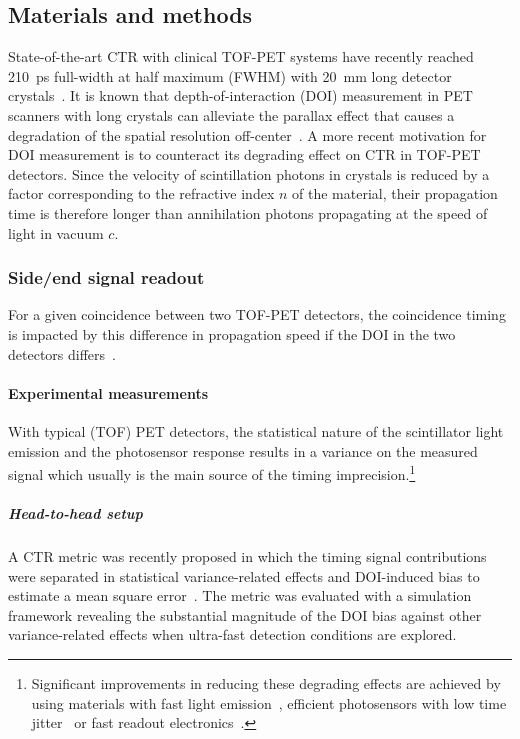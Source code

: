 \documentclass[demo]{OUP-EJ}
\begin{document}
\subsection{Materials and methods}\label{isect2}



State-of-the-art CTR with clinical TOF-PET systems have recently reached 210~ps full-width at half maximum (FWHM) with 20~mm long detector crystals~\citep{vanSluis2019}.
It is known that depth-of-interaction (DOI) measurement in PET scanners with long crystals can alleviate the parallax effect that causes a degradation of the spatial resolution off-center~\citep{Lecomte2009,Cherry2012}.
A more recent motivation for DOI measurement is to counteract its degrading effect on CTR in TOF-PET detectors.
Since the velocity of scintillation photons in crystals is reduced by a factor corresponding to the refractive index $n$ of the material, their propagation time is therefore longer than annihilation photons propagating at the speed of light in vacuum $c$.

\subsubsection{Side/end signal readout}\label{isect3}

For a given coincidence between two TOF-PET detectors, the coincidence timing is impacted by this difference in propagation speed if the DOI in the two detectors differs~\citep{Moses1999}.


\paragraph{Experimental measurements}
\label{sec:expMeas}


With typical (TOF) PET detectors, the statistical nature of the scintillator light emission and the photosensor response results in a variance on the measured signal which usually is the main source of the timing imprecision.\footnote{
Significant improvements in reducing these degrading effects are achieved by using materials with fast light emission~\citep{Lucchini2016,Turtos2016a,Prochzkov2018}, efficient photosensors with low time jitter~\citep{Schaart2016,Acerbi2018,Nolet2018} or fast readout electronics~\citep{Cates2018,Gundacker2019}.}

\subparagraph{Head-to-head setup}
\label{sec:headtoheadsetup}

A CTR metric was recently proposed in which the timing signal contributions were separated in statistical variance-related effects and DOI-induced bias to estimate a mean square error~\citep{Toussaint2019}.
The metric was evaluated with a simulation framework revealing the substantial magnitude of the DOI bias against other variance-related effects when ultra-fast detection conditions are explored.
\end{document}
